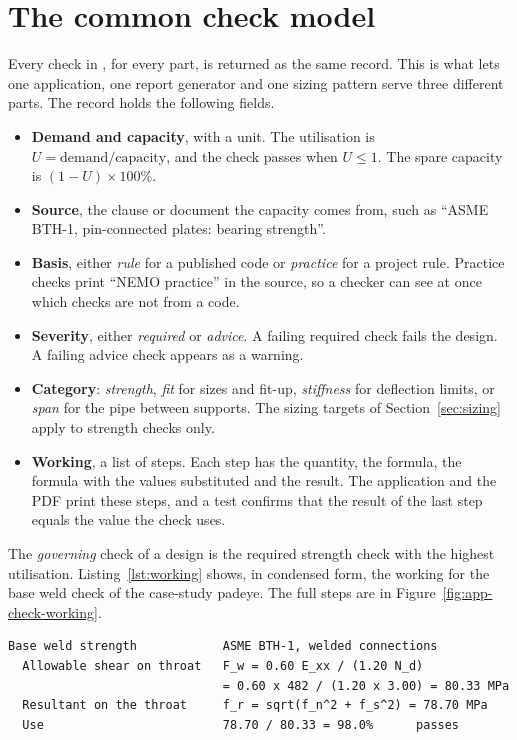 \section{The common check model}
\label{sec:check-model}

Every check in \NEMO{}, for every part, is returned as the same record. This is
what lets one application, one report generator and one sizing pattern serve
three different parts. The record holds the following fields.

\begin{itemize}
    \item \textbf{Demand and capacity}, with a unit. The utilisation is
    $U = \text{demand}/\text{capacity}$, and the check passes when
    $U \leq 1$. The spare capacity is $(1-U) \times 100\%$.
    \item \textbf{Source}, the clause or document the capacity comes from,
    such as ``ASME BTH-1, pin-connected plates: bearing strength''.
    \item \textbf{Basis}, either \emph{rule} for a published code or
    \emph{practice} for a project rule. Practice checks print ``NEMO
    practice'' in the source, so a checker can see at once which checks are
    not from a code.
    \item \textbf{Severity}, either \emph{required} or \emph{advice}. A
    failing required check fails the design. A failing advice check appears
    as a warning.
    \item \textbf{Category}: \emph{strength}, \emph{fit} for sizes and
    fit-up, \emph{stiffness} for deflection limits, or \emph{span} for the
    pipe between supports. The sizing targets of
    Section~\ref{sec:sizing} apply to strength checks only.
    \item \textbf{Working}, a list of steps. Each step has the quantity, the
    formula, the formula with the values substituted and the result. The
    application and the PDF print these steps, and a test confirms that the
    result of the last step equals the value the check uses.
\end{itemize}

The \emph{governing} check of a design is the required strength check with the
highest utilisation. Listing~\ref{lst:working} shows, in condensed form, the
working for the base weld check of the case-study padeye. The full steps are in
Figure~\ref{fig:app-check-working}.

\begin{lstlisting}[language={}, numbers=none, caption={Working for one check, condensed}, label={lst:working}]
Base weld strength            ASME BTH-1, welded connections
  Allowable shear on throat   F_w = 0.60 E_xx / (1.20 N_d)
                              = 0.60 x 482 / (1.20 x 3.00) = 80.33 MPa
  Resultant on the throat     f_r = sqrt(f_n^2 + f_s^2) = 78.70 MPa
  Use                         78.70 / 80.33 = 98.0%      passes
\end{lstlisting}

